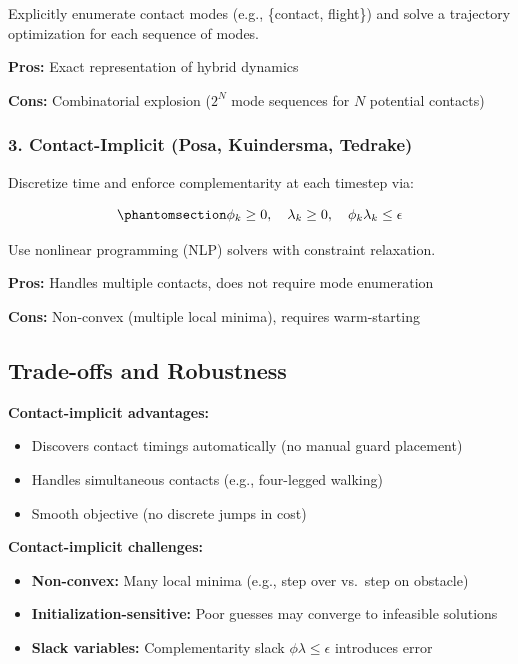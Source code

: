 \documentclass[
  letterpaper,
  DIV=11,
  numbers=noendperiod]{scrartcl}
\providecommand{\tightlist}{%
  \setlength{\itemsep}{0pt}\setlength{\parskip}{0pt}}\usepackage{longtable,booktabs,array}
\begin{document}
Explicitly enumerate contact modes (e.g., \{contact, flight\}) and solve
a trajectory optimization for each sequence of modes.

\textbf{Pros:} Exact representation of hybrid dynamics

\textbf{Cons:} Combinatorial explosion (\(2^N\) mode sequences for \(N\)
potential contacts)

\subsubsection{3. Contact-Implicit (Posa, Kuindersma,
Tedrake)}\label{contact-implicit-posa-kuindersma-tedrake}

Discretize time and enforce complementarity at each timestep via:

\begin{equation}\phantomsection\label{eq-contact-implicit-discrete}{
\phi_k \geq 0, \quad \lambda_k \geq 0, \quad \phi_k \lambda_k \leq \epsilon
}\end{equation}

Use nonlinear programming (NLP) solvers with constraint relaxation.

\textbf{Pros:} Handles multiple contacts, does not require mode
enumeration

\textbf{Cons:} Non-convex (multiple local minima), requires
warm-starting

\subsection{Trade-offs and Robustness}\label{trade-offs-and-robustness}

\textbf{Contact-implicit advantages:}

\begin{itemize}
\tightlist
\item
  Discovers contact timings automatically (no manual guard placement)
\item
  Handles simultaneous contacts (e.g., four-legged walking)
\item
  Smooth objective (no discrete jumps in cost)
\end{itemize}

\textbf{Contact-implicit challenges:}

\begin{itemize}
\tightlist
\item
  \textbf{Non-convex:} Many local minima (e.g., step over vs.~step on
  obstacle)
\item
  \textbf{Initialization-sensitive:} Poor guesses may converge to
  infeasible solutions
\item
  \textbf{Slack variables:} Complementarity slack
  \(\phi \lambda \leq \epsilon\) introduces error
\end{itemize}
\end{document}

